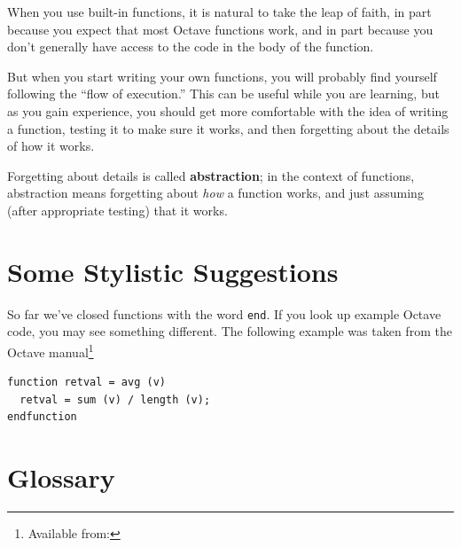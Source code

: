 \documentclass{book}
\begin{document}
When you use built-in functions, it is natural to take the leap
of faith, in part because you expect that most
Octave functions work, and in part because you don't
generally have access to the code in the body of the function.

But when you start writing your own functions, you will probably
find yourself following the ``flow of execution.'' This can
be useful while you are learning, but as you gain experience, you
should get more comfortable with the idea of writing a function,
testing it to make sure it works, and then forgetting about the
details of how it works.

Forgetting about details is called {\bf abstraction}; in the context
of functions, abstraction means forgetting about {\em how} a function
works, and just assuming (after appropriate testing) that it works.

\section{Some Stylistic Suggestions}
\label{style1}

So far we've closed functions with the word {\tt end}. If you look up
example Octave code, you may see something different. The following example was
taken from the Octave manual\footnote{Available from: }
%
\begin{verbatim}
function retval = avg (v)
  retval = sum (v) / length (v);
endfunction
\end{verbatim}
%

\section{Glossary}
\end{document}
